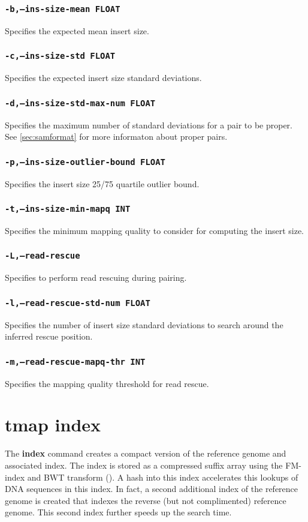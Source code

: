 \documentclass[a4paper,12pt]{book}
\newcommand{\TT}[1]{{\tt #1}} %
\newcommand{\BF}[1]{{\bf #1}} %
\begin{document}
\subsubsection{\TT{-b,--ins-size-mean FLOAT}}
Specifies the expected mean insert size.

\subsubsection{\TT{-c,--ins-size-std FLOAT}}
Specifies the expected insert size standard deviations.

\subsubsection{\TT{-d,--ins-size-std-max-num FLOAT}}
Specifies the maximum number of standard deviations for a pair to be proper.
See \autoref{sec:samformat} for more informaton about proper pairs.


\subsubsection{\TT{-p,--ins-size-outlier-bound FLOAT}}
Specifies the insert size 25/75 quartile outlier bound.

\subsubsection{\TT{-t,--ins-size-min-mapq INT}}
Specifies the minimum mapping quality to consider for computing the insert size.

\subsubsection{\TT{-L,--read-rescue}}
Specifies to perform read rescuing during pairing.

\subsubsection{\TT{-l,--read-rescue-std-num FLOAT}}
Specifies the number of insert size standard deviations to search around the inferred rescue position.

\subsubsection{\TT{-m,--read-rescue-mapq-thr INT}}
Specifies the mapping quality threshold for read rescue.

\section{tmap index}
\label{sec:index}
The \BF{index} command creates a compact version of the reference genome and associated index.
The index is stored as a compressed suffix array using the FM-index and BWT transform (\cite{FM-index,BWT}).
A hash into this index accelerates this lookups of DNA sequences in this index.
In fact, a second additional index of the reference genome is created that indexes the reverse (but not complimented) reference genome.
This second index further speeds up the search time.
\end{document}
